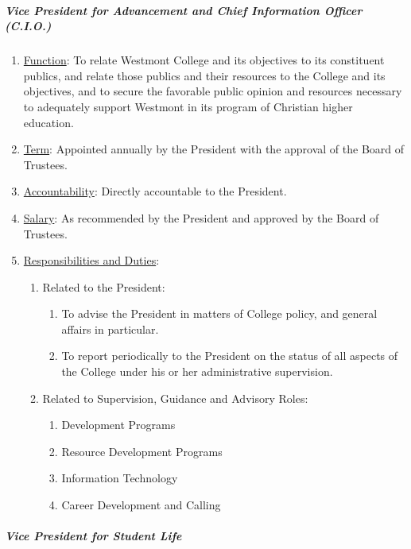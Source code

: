 				\subparagraph{Vice President for Advancement and Chief Information Officer (C.I.O.)}
					\begin{enumerate}
						\item{\underline{Function}:  To relate Westmont College and its objectives to its constituent publics, and relate those publics and their resources to the College and its objectives, and to secure the favorable public opinion and resources necessary to adequately support Westmont in its program of Christian higher education.}
						\item{\underline{Term}:  Appointed annually by the President with the approval of the Board of Trustees.}
						\item{\underline{Accountability}:  Directly accountable to the President.}
						\item{\underline{Salary}:  As recommended by the President and approved by the Board of Trustees.}
						\item{\underline{Responsibilities and Duties}:
							\begin{enumerate}
								\item{Related to the President:
									\begin{enumerate}
										\item{To advise the President in matters of College policy, and general affairs in particular.}
										\item{To report periodically to the President on the status of all aspects of the College under his or her administrative supervision.}
									\end{enumerate}
								}
								\item{Related to Supervision, Guidance and Advisory Roles:
									\begin{enumerate}
										\item{Development Programs}
										\item{Resource Development Programs}
										\item{Information Technology}
										\item{Career Development and Calling}
									\end{enumerate}
								}
							\end{enumerate}
						}
					\end{enumerate}
				\subparagraph{Vice President for Student Life}
